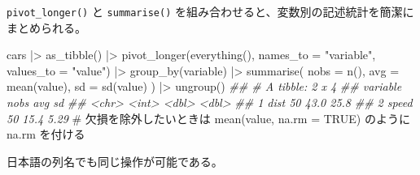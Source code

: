 \documentclass[
  letterpaper,
  xelatex,
  ja=standard, xelatex]{bxjsbook}
\newenvironment{Shaded}{\begin{snugshade}}{\end{snugshade}}
\newcommand{\AttributeTok}[1]{\textcolor[rgb]{0.40,0.45,0.13}{#1}}
\newcommand{\CommentTok}[1]{\textcolor[rgb]{0.37,0.37,0.37}{#1}}
\newcommand{\DocumentationTok}[1]{\textcolor[rgb]{0.37,0.37,0.37}{\textit{#1}}}
\newcommand{\FunctionTok}[1]{\textcolor[rgb]{0.28,0.35,0.67}{#1}}
\newcommand{\NormalTok}[1]{\textcolor[rgb]{0.00,0.23,0.31}{#1}}
\newcommand{\SpecialCharTok}[1]{\textcolor[rgb]{0.37,0.37,0.37}{#1}}
\newcommand{\StringTok}[1]{\textcolor[rgb]{0.13,0.47,0.30}{#1}}
\begin{document}
\texttt{pivot\_longer()} と \texttt{summarise()}
を組み合わせると、変数別の記述統計を簡潔にまとめられる。

\begin{Shaded}
\begin{Highlighting}[]
\NormalTok{cars }\SpecialCharTok{|\textgreater{}} 
  \FunctionTok{as\_tibble}\NormalTok{() }\SpecialCharTok{|\textgreater{}} 
  \FunctionTok{pivot\_longer}\NormalTok{(}\FunctionTok{everything}\NormalTok{(), }\AttributeTok{names\_to =} \StringTok{"variable"}\NormalTok{, }\AttributeTok{values\_to =} \StringTok{"value"}\NormalTok{) }\SpecialCharTok{|\textgreater{}} 
  \FunctionTok{group\_by}\NormalTok{(variable) }\SpecialCharTok{|\textgreater{}}
  \FunctionTok{summarise}\NormalTok{(}
    \AttributeTok{nobs =} \FunctionTok{n}\NormalTok{(),}
    \AttributeTok{avg  =} \FunctionTok{mean}\NormalTok{(value),}
    \AttributeTok{sd   =} \FunctionTok{sd}\NormalTok{(value)}
\NormalTok{  ) }\SpecialCharTok{|\textgreater{}}
  \FunctionTok{ungroup}\NormalTok{()}
\DocumentationTok{\#\# \# A tibble: 2 x 4}
\DocumentationTok{\#\#   variable  nobs   avg    sd}
\DocumentationTok{\#\#   \textless{}chr\textgreater{}    \textless{}int\textgreater{} \textless{}dbl\textgreater{} \textless{}dbl\textgreater{}}
\DocumentationTok{\#\# 1 dist        50  43.0 25.8 }
\DocumentationTok{\#\# 2 speed       50  15.4  5.29}
\CommentTok{\# 欠損を除外したいときは mean(value, na.rm = TRUE) のように na.rm を付ける}
\end{Highlighting}
\end{Shaded}

日本語の列名でも同じ操作が可能である。
\end{document}
